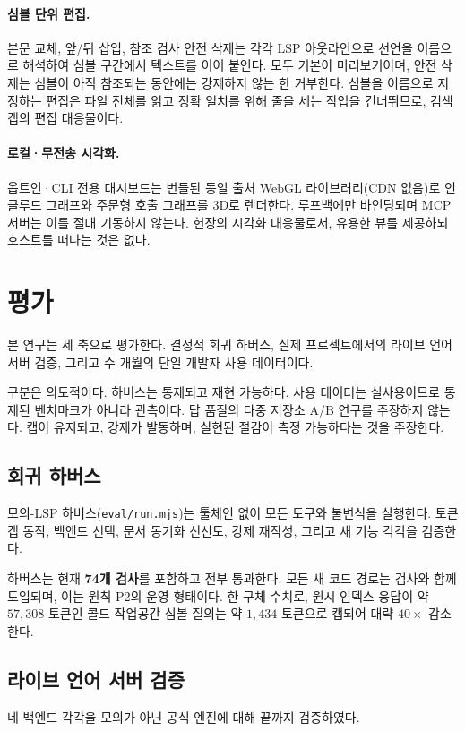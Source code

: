 \documentclass[11pt]{article}
\begin{document}
\paragraph{심볼 단위 편집.}
본문 교체, 앞/뒤 삽입, 참조 검사 안전 삭제는 각각 LSP 아웃라인으로 선언을 이름으로 해석하여
심볼 구간에서 텍스트를 이어 붙인다. 모두 기본이 미리보기이며, 안전 삭제는 심볼이 아직 참조되는
동안에는 강제하지 않는 한 거부한다. 심볼을 이름으로 지정하는 편집은 파일 전체를 읽고 정확
일치를 위해 줄을 세는 작업을 건너뛰므로, 검색 캡의 편집 대응물이다.

\paragraph{로컬·무전송 시각화.}
옵트인·CLI 전용 대시보드는 번들된 동일 출처 WebGL 라이브러리(CDN 없음)로 인클루드 그래프와
주문형 호출 그래프를 3D로 렌더한다. 루프백에만 바인딩되며 MCP 서버는 이를 절대 기동하지 않는다.
헌장의 시각화 대응물로서, 유용한 뷰를 제공하되 호스트를 떠나는 것은 없다.

\section{평가}
\label{sec:eval}

본 연구는 세 축으로 평가한다. 결정적 회귀 하버스, 실제 프로젝트에서의 라이브 언어 서버 검증,
그리고 수 개월의 단일 개발자 사용 데이터이다.

구분은 의도적이다. 하버스는 통제되고 재현 가능하다. 사용 데이터는 실사용이므로 통제된
벤치마크가 아니라 관측이다. 답 품질의 다중 저장소 A/B 연구를 주장하지 않는다. 캡이 유지되고,
강제가 발동하며, 실현된 절감이 측정 가능하다는 것을 주장한다.

\subsection{회귀 하버스}
모의-LSP 하버스(\texttt{eval/run.mjs})는 툴체인 없이 모든 도구와 불변식을 실행한다. 토큰 캡
동작, 백엔드 선택, 문서 동기화 신선도, 강제 재작성, 그리고 새 기능 각각을 검증한다.

하버스는 현재 \textbf{74개 검사}를 포함하고 전부 통과한다. 모든 새 코드 경로는 검사와 함께
도입되며, 이는 원칙 P2의 운영 형태이다. 한 구체 수치로, 원시 인덱스 응답이 약 $57{,}308$
토큰인 콜드 작업공간-심볼 질의는 약 $1{,}434$ 토큰으로 캡되어 대략 $40\times$ 감소한다.

\subsection{라이브 언어 서버 검증}
네 백엔드 각각을 모의가 아닌 공식 엔진에 대해 끝까지 검증하였다.
\end{document}
